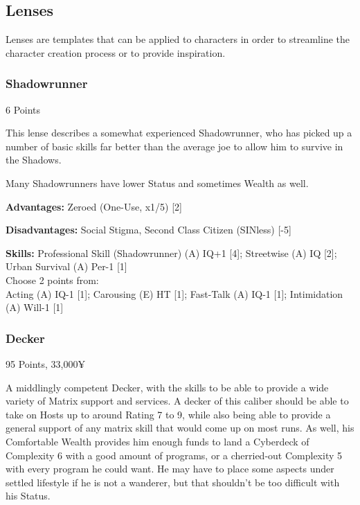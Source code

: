 \begin{multicols}{2}
	
	\subsection{Lenses}
	
	Lenses are templates that can be applied to characters in order to streamline the character creation process or to provide inspiration.
	
	\subsubsection{Shadowrunner}
	\begin{flushright}
		6 Points
	\end{flushright}
	
	This lense describes a somewhat experienced Shadowrunner, who has picked up a number of basic skills far better than the average joe to allow him to survive in the Shadows.
	
	Many Shadowrunners have lower Status and sometimes Wealth as well.
	
	
	\textbf{Advantages:}
	Zeroed (One-Use, x1/5) [2]
	
	\textbf{Disadvantages:}
	Social Stigma, Second Class Citizen (SINless) [-5]
	
	\textbf{Skills:}
	Professional Skill (Shadowrunner) (A) IQ+1 [4]; Streetwise (A) IQ [2]; Urban Survival (A) Per-1 [1]\\
	Choose 2 points from:\\
	Acting (A) IQ-1 [1]; Carousing (E) HT [1]; Fast-Talk (A) IQ-1 [1]; Intimidation (A) Will-1 [1]
	
	\subsubsection{Decker}
	\begin{flushright}
		95 Points, 33,000¥
	\end{flushright}
	
	A middlingly competent Decker, with the skills to be able to provide a wide variety of Matrix support and services. A decker of this caliber should be able to take on Hosts up to around Rating 7 to 9, while also being able to provide a general support of any matrix skill that would come up on most runs. As well, his Comfortable Wealth provides him enough funds to land a Cyberdeck of Complexity 6 with a good amount of programs, or a cherried-out Complexity 5 with every program he could want. He may have to place some aspects under settled lifestyle if he is not a wanderer, but that shouldn't be too difficult with his Status.
	

\end{multicols}
